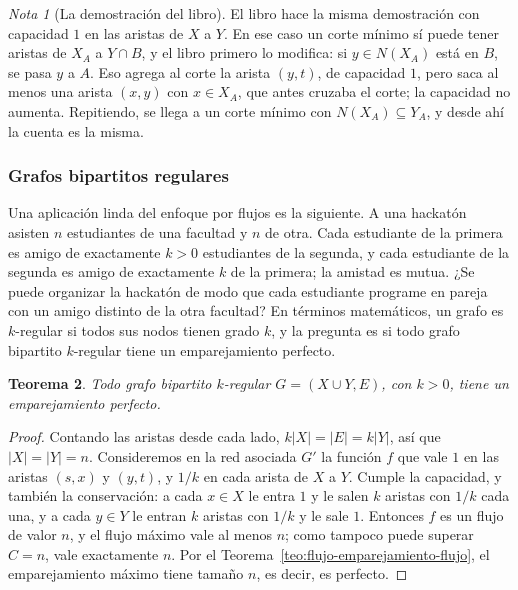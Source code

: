 \documentclass[12pt, spanish, oneside, openany]{book}
\theoremstyle{uprightplain}
\newtheorem{teorema}{Teorema}[section]
\theoremstyle{definition}
\theoremstyle{remark}
\newtheorem{nota}[teorema]{Nota}
\theoremstyle{definition}
\begin{document}
\begin{nota}[La demostración del libro]
\label{nota:flujo-hall-libro}
El libro hace la misma demostración con capacidad $1$ en las aristas de $X$ a $Y$. En ese caso un corte mínimo sí puede tener aristas de $X_A$ a $Y\cap B$, y el libro primero lo modifica: si $y\in N(X_A)$ está en $B$, se pasa $y$ a $A$. Eso agrega al corte la arista $(y,t)$, de capacidad $1$, pero saca al menos una arista $(x,y)$ con $x\in X_A$, que antes cruzaba el corte; la capacidad no aumenta. Repitiendo, se llega a un corte mínimo con $N(X_A)\subseteq Y_A$, y desde ahí la cuenta es la misma.
\end{nota}

\subsubsection{Grafos bipartitos regulares}

Una aplicación linda del enfoque por flujos es la siguiente. A una hackatón asisten $n$ estudiantes de una facultad y $n$ de otra. Cada estudiante de la primera es amigo de exactamente $k>0$ estudiantes de la segunda, y cada estudiante de la segunda es amigo de exactamente $k$ de la primera; la amistad es mutua. ¿Se puede organizar la hackatón de modo que cada estudiante programe en pareja con un amigo distinto de la otra facultad? En términos matemáticos, un grafo es $k$-regular si todos sus nodos tienen grado $k$, y la pregunta es si todo grafo bipartito $k$-regular tiene un emparejamiento perfecto.

\begin{teorema}
\label{teo:flujo-k-regular}
Todo grafo bipartito $k$-regular $G=(X\cup Y,E)$, con $k>0$, tiene un emparejamiento perfecto.
\end{teorema}
\begin{proof}
Contando las aristas desde cada lado, $k|X|=|E|=k|Y|$, así que $|X|=|Y|=n$. Consideremos en la red asociada $G'$ la función $f$ que vale $1$ en las aristas $(s,x)$ y $(y,t)$, y $1/k$ en cada arista de $X$ a $Y$. Cumple la capacidad, y también la conservación: a cada $x\in X$ le entra $1$ y le salen $k$ aristas con $1/k$ cada una, y a cada $y\in Y$ le entran $k$ aristas con $1/k$ y le sale $1$. Entonces $f$ es un flujo de valor $n$, y el flujo máximo vale al menos $n$; como tampoco puede superar $C=n$, vale exactamente $n$. Por el Teorema~\ref{teo:flujo-emparejamiento-flujo}, el emparejamiento máximo tiene tamaño $n$, es decir, es perfecto.
\end{proof}
\end{document}
